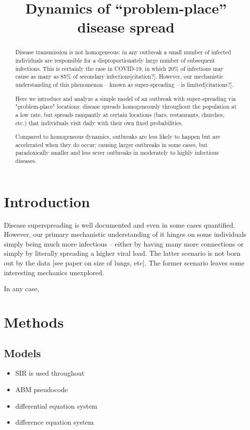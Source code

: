 \documentclass{article}
\title{Dynamics of ``problem-place'' disease spread}
\author{}
\date{}
\begin{document}
\maketitle

\begin{abstract}
Disease transmission is not homogeneous: in any outbreak a small
number of infected individuals
are responsible for a disproportionately large number of subsequent
infections.
This is certainly the case in COVID-19, in which 20\% of infections may cause
as many as 85\% of secondary infections[citation?].
However, our mechanistic understanding
of this phenomenon – known as super-spreading – is limited[citations?].

Here we introduce and analyze
a simple model of an outbreak with super-spreading via "problem-place" locations:
disease spreads homogeneously throughout the population at a low rate, but
spreads rampantly at certain locations (bars, restaurants, churches, etc.)
that individuals visit daily with their own fixed probabilities.

Compared to homogeneous dynamics, outbreaks are less
likely to happen but are accelerated when they do occur; causing larger
outbreaks in some cases, but paradoxically smaller and less sever outbreaks 
in moderately to highly infectious diseases.
\end{abstract}


\section{Introduction}

Disease superspreading is well documented and even in some cases quantified.
However, our primary mechanistic understanding of it hinges on some individuals
simply being much more infectious – either by having many more connections or
simply by literally spreading a higher viral load. The latter scenario is 
not born out by the data [see paper on size of lungs, etc].
The former scenario leaves some interesting mechanics unexplored.

In any case, 

\section{Methods}
\subsection{Models}

\begin{itemize}
\item SIR is used throughout
\item ABM pseudocode
\item differential equation system
\item difference equation system
\end{itemize}
\end{document}

